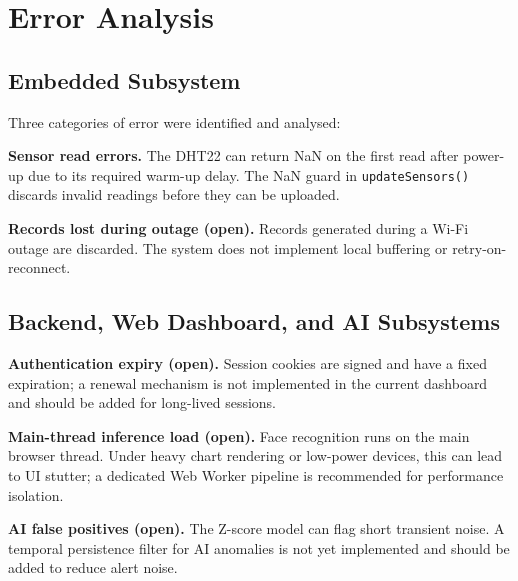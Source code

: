 \section{Error Analysis}

\subsection{Embedded Subsystem}

Three categories of error were identified and analysed:

\textbf{Sensor read errors.}
The DHT22 can return NaN on the first read after power-up due to its required
warm-up delay. The NaN guard in \texttt{updateSensors()} discards invalid readings
before they can be uploaded.

\textbf{Records lost during outage (open).}
Records generated during a Wi-Fi outage are discarded.
The system does not implement local buffering or retry-on-reconnect.

\subsection{Backend, Web Dashboard, and AI Subsystems}

\textbf{Authentication expiry (open).}
Session cookies are signed and have a fixed expiration; a renewal mechanism is not
implemented in the current dashboard and should be added for long-lived sessions.

\textbf{Main-thread inference load (open).}
Face recognition runs on the main browser thread. Under heavy chart rendering or
low-power devices, this can lead to UI stutter; a dedicated Web Worker pipeline is
recommended for performance isolation.

\textbf{AI false positives (open).}
The Z-score model can flag short transient noise. A temporal persistence filter for
AI anomalies is not yet implemented and should be added to reduce alert noise.
